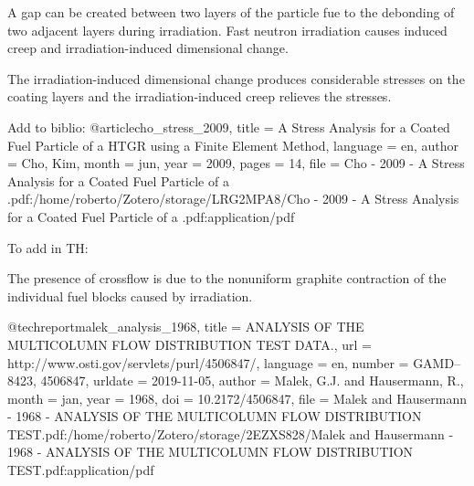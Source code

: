 A gap can be created between two layers of the particle fue to the debonding of two adjacent layers during irradiation.
Fast neutron irradiation causes induced creep and irradiation-induced dimensional change.

The irradiation-induced dimensional change produces considerable stresses on the coating layers and the irradiation-induced creep relieves the stresses.

\cite{cho_stress_2009}

Add to biblio:
@article{cho_stress_2009,
	title = {A {Stress} {Analysis} for a {Coated} {Fuel} {Particle} of a {HTGR} using a {Finite} {Element} {Method}},
	language = {en},
	author = {Cho, Kim},
	month = jun,
	year = {2009},
	pages = {14},
	file = {Cho - 2009 - A Stress Analysis for a Coated Fuel Particle of a .pdf:/home/roberto/Zotero/storage/LRG2MPA8/Cho - 2009 - A Stress Analysis for a Coated Fuel Particle of a .pdf:application/pdf}
}

To add in TH:

The presence of crossflow is due to the nonuniform graphite contraction of the individual fuel blocks caused by irradiation.

\cite{malek_analysis_1968}

@techreport{malek_analysis_1968,
	title = {{ANALYSIS} {OF} {THE} {MULTICOLUMN} {FLOW} {DISTRIBUTION} {TEST} {DATA}.},
	url = {http://www.osti.gov/servlets/purl/4506847/},
	language = {en},
	number = {GAMD--8423, 4506847},
	urldate = {2019-11-05},
	author = {Malek, G.J. and Hausermann, R.},
	month = jan,
	year = {1968},
	doi = {10.2172/4506847},
	file = {Malek and Hausermann - 1968 - ANALYSIS OF THE MULTICOLUMN FLOW DISTRIBUTION TEST.pdf:/home/roberto/Zotero/storage/2EZXS828/Malek and Hausermann - 1968 - ANALYSIS OF THE MULTICOLUMN FLOW DISTRIBUTION TEST.pdf:application/pdf}
}